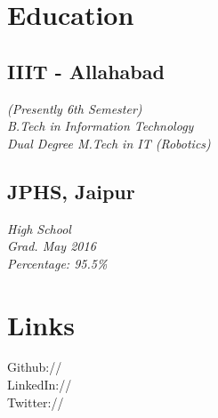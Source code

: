 \documentclass[]{deedy-resume-openfont}
\begin{document}
%
%
\lastupdated

%
%




%
%

\begin{minipage}[t]{0.33\textwidth} 


\section{Education} 

\subsection{IIIT - Allahabad}
\textit{(Presently 6th Semester)\\B.Tech in Information Technology\\ Dual Degree M.Tech in IT (Robotics)}\\ 
\sectionsep

\subsection{JPHS, Jaipur}
\textit{High School\\Grad. May 2016\\ Percentage: 95.5\%\\}
\sectionsep


\section{Links} 
Github:// \href{https://github.com/Ellusionists}{} \\
LinkedIn://  \href{https://www.linkedin.com/in/aditya-goel-11a578134/}{} \\
Twitter://  \href{https://twitter.com/itsAdityaGoel}{} \\
\sectionsep


\end{minipage}
\end{document}
